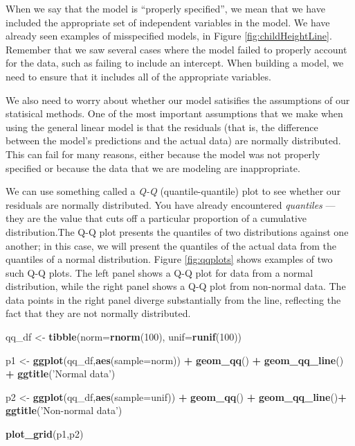 \documentclass[12pt,]{book}
\newenvironment{Shaded}{\begin{snugshade}}{\end{snugshade}}
\newcommand{\DataTypeTok}[1]{\textcolor[rgb]{0.13,0.29,0.53}{#1}}
\newcommand{\DecValTok}[1]{\textcolor[rgb]{0.00,0.00,0.81}{#1}}
\newcommand{\KeywordTok}[1]{\textcolor[rgb]{0.13,0.29,0.53}{\textbf{#1}}}
\newcommand{\NormalTok}[1]{#1}
\newcommand{\OperatorTok}[1]{\textcolor[rgb]{0.81,0.36,0.00}{\textbf{#1}}}
\newcommand{\StringTok}[1]{\textcolor[rgb]{0.31,0.60,0.02}{#1}}
\theoremstyle{definition}
\theoremstyle{definition}
\theoremstyle{definition}
\theoremstyle{remark}
\begin{document}
When we say that the model is ``properly specified'', we mean that we have included the appropriate set of independent variables in the model. We have already seen examples of misspecified models, in Figure \ref{fig:childHeightLine}. Remember that we saw several cases where the model failed to properly account for the data, such as failing to include an intercept. When building a model, we need to ensure that it includes all of the appropriate variables.

We also need to worry about whether our model satisifies the assumptions of our statisical methods. One of the most important assumptions that we make when using the general linear model is that the residuals (that is, the difference between the model's predictions and the actual data) are normally distributed. This can fail for many reasons, either because the model was not properly specified or because the data that we are modeling are inappropriate.

We can use something called a \emph{Q-Q} (quantile-quantile) plot to see whether our residuals are normally distributed. You have already encountered \emph{quantiles} --- they are the value that cuts off a particular proportion of a cumulative distribution.The Q-Q plot presents the quantiles of two distributions against one another; in this case, we will present the quantiles of the actual data from the quantiles of a normal distribution. Figure \ref{fig:qqplots} shows examples of two such Q-Q plots. The left panel shows a Q-Q plot for data from a normal distribution, while the right panel shows a Q-Q plot from non-normal data. The data points in the right panel diverge substantially from the line, reflecting the fact that they are not normally distributed.

\begin{Shaded}
\begin{Highlighting}[]
\NormalTok{qq_df <-}\StringTok{ }\KeywordTok{tibble}\NormalTok{(}\DataTypeTok{norm=}\KeywordTok{rnorm}\NormalTok{(}\DecValTok{100}\NormalTok{),}
                \DataTypeTok{unif=}\KeywordTok{runif}\NormalTok{(}\DecValTok{100}\NormalTok{))}

\NormalTok{p1 <-}\StringTok{ }\KeywordTok{ggplot}\NormalTok{(qq_df,}\KeywordTok{aes}\NormalTok{(}\DataTypeTok{sample=}\NormalTok{norm)) }\OperatorTok{+}\StringTok{ }
\StringTok{  }\KeywordTok{geom_qq}\NormalTok{() }\OperatorTok{+}\StringTok{ }
\StringTok{  }\KeywordTok{geom_qq_line}\NormalTok{() }\OperatorTok{+}\StringTok{ }
\StringTok{  }\KeywordTok{ggtitle}\NormalTok{(}\StringTok{'Normal data'}\NormalTok{)}

\NormalTok{p2 <-}\StringTok{ }\KeywordTok{ggplot}\NormalTok{(qq_df,}\KeywordTok{aes}\NormalTok{(}\DataTypeTok{sample=}\NormalTok{unif)) }\OperatorTok{+}\StringTok{ }
\StringTok{  }\KeywordTok{geom_qq}\NormalTok{() }\OperatorTok{+}\StringTok{ }
\StringTok{  }\KeywordTok{geom_qq_line}\NormalTok{()}\OperatorTok{+}\StringTok{ }
\StringTok{  }\KeywordTok{ggtitle}\NormalTok{(}\StringTok{'Non-normal data'}\NormalTok{)}

\KeywordTok{plot_grid}\NormalTok{(p1,p2)}
\end{Highlighting}
\end{Shaded}
\end{document}
